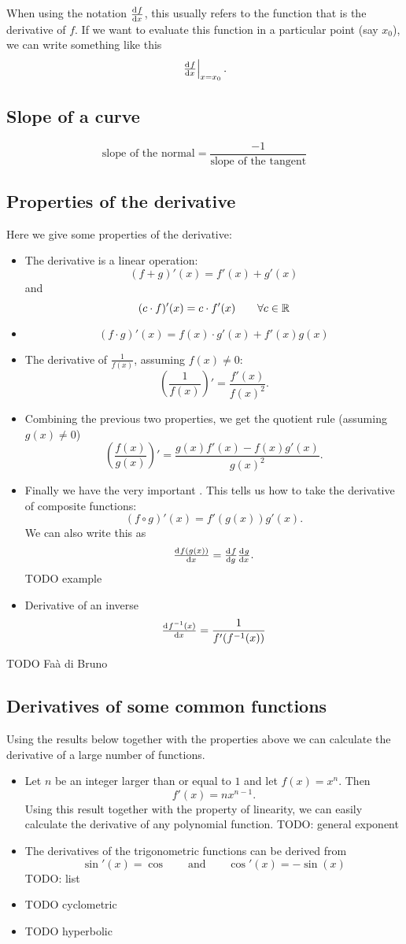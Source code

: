 When using the notation $\od{f}{x}$, this usually refers to the function that is the derivative of $f$. If we want to evaluate this function in a particular point (say $x_0$), we can write something like this
\[ \left.\od{f}{x}\right|_{x=x_0}. \]

\subsection{Slope of a curve}
\[ \text{slope of the normal} = \frac{-1}{\text{slope of the tangent}} \]

\subsection{Properties of the derivative}
Here we give some properties of the derivative:
\begin{itemize}
\item The derivative is a linear operation:
\[ (f+g)'(x) = f'(x) + g'(x) \]
and
\[ (c\cdot f)'(x) = c\cdot f'(x) \qquad \forall c \in \mathbb{R} \]
\item {}
\[ (f\cdot g)'(x) = f(x)\cdot g'(x) + f'(x)g(x) \]
\item The derivative of $\frac{1}{f(x)}$, assuming $f(x) \neq 0$:
\[ \left(\frac{1}{f(x)}\right)' = \frac{f'(x)}{f(x)^2}. \]
\item Combining the previous two properties, we get the quotient rule (assuming $g(x)\neq 0$)
\[ \left(\frac{f(x)}{g(x)}\right)' = \frac{g(x)f'(x) - f(x)g'(x)}{g(x)^2}. \]
\item Finally we have the very important . This tells us how to take the derivative of composite functions:
\[ (f \circ g)'(x) = f'(g(x))g'(x). \]
We can also write this as
\[ \od{f(g(x))}{x} = \od{f}{g}\od{g}{x}. \]
TODO example
\item Derivative of an inverse
\[ \od{f^{-1}(x)}{x} = \frac{1}{f'(f^{-1}(x))} \]
\end{itemize}

TODO Faà di Bruno

\subsection{Derivatives of some common functions}
Using the results below together with the properties above we can calculate the derivative of a large number of functions.

\begin{itemize}
\item Let $n$ be an integer larger than or equal to $1$ and let $f(x) = x^n$. Then
\[ f'(x) = n x^{n-1}. \]
Using this result together with the property of linearity, we can easily calculate the derivative of any polynomial function. TODO: general exponent
\item The derivatives of the trigonometric functions can be derived from
\[ \sin'(x) = \cos \qquad \text{and} \qquad \cos'(x) = -\sin(x) \]
TODO: list
\item TODO cyclometric
\item TODO hyperbolic
\end{itemize}

